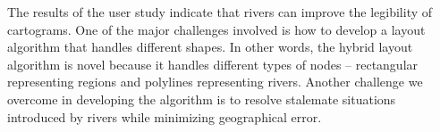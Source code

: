 The results of the user study indicate that rivers can improve the legibility of cartograms. One of the major challenges involved is how to develop a layout algorithm that handles different shapes. In other words, the hybrid layout algorithm is novel because it handles different types of nodes -- rectangular representing regions and polylines representing rivers. Another challenge we overcome in developing the algorithm is to resolve stalemate situations introduced by rivers while minimizing geographical error.